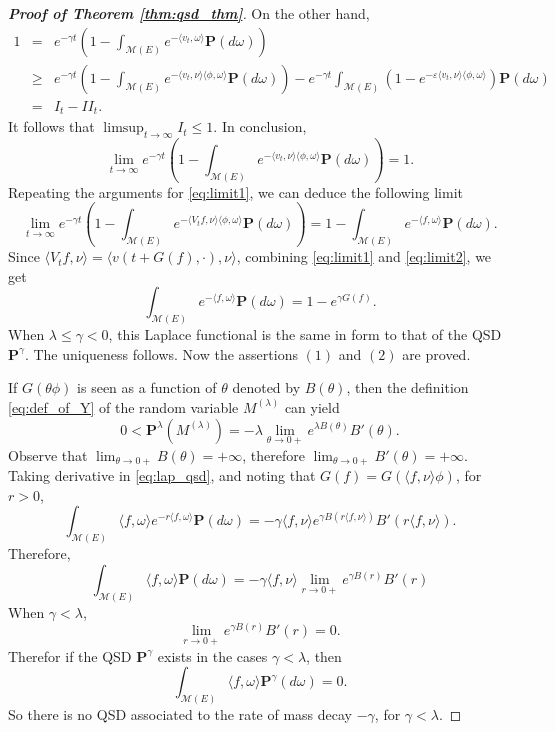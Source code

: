 \documentclass[12pt,a4paper]{amsart}
\numberwithin{equation}{section}
\theoremstyle{plain}
\theoremstyle{definition}
\begin{document}
{\begin{proof}[{\bf Proof of Theorem \ref{thm:qsd_thm}}]
  On the other hand,
  \begin{eqnarray*}
    1&=&e^{-\gamma t}\left(1-\int_{\mathcal M(E)}e^{-\langle v_t,\omega\rangle }\mathbf P(d\omega)\right)\\
     &\geq &e^{-\gamma t}\left(1-\int_{\mathcal M(E)}e^{-\langle v_t,\nu\rangle\langle\phi,\omega\rangle }\mathbf P(d\omega)\right)-e^{-\gamma t}\int_{\mathcal M(E)}\left(1-e^{-\varepsilon\langle v_t,\nu\rangle\langle\phi,\omega\rangle  }\right)\mathbf P(d\omega)\\
     &=&I_t-II_t.
  \end{eqnarray*}
  It follows that $\limsup_{t\to\infty}I_t\leq 1$. In conclusion,
  \begin{equation}\label{eq:limit1}
    \lim_{t\rightarrow\infty}e^{-\gamma t}\left(1-\int_{\mathcal M(E)}e^{-\langle v_t,\nu\rangle\langle\phi,\omega\rangle }\mathbf P(d\omega)\right)=1.
  \end{equation}
  Repeating the arguments for \eqref{eq:limit1}, we can deduce the following limit
  \begin{equation}\label{eq:limit2}
    \lim_{t\rightarrow\infty}e^{-\gamma t}\left(1-\int_{\mathcal M(E)}e^{-\langle V_tf,\nu\rangle \langle \phi,\omega\rangle }\mathbf P(d\omega)\right)=1-\int_{\mathcal M(E)}e^{-\langle f,\omega\rangle }\mathbf P(d\omega).
  \end{equation}
  Since $\langle V_tf,\nu\rangle =\langle v(t+G(f),\cdot),\nu\rangle $, combining \eqref{eq:limit1} and \eqref{eq:limit2}, we get
  \begin{equation}\label{eq:lap_qsd}
    \int_{\mathcal M(E)}e^{-\langle f,\omega\rangle }\mathbf P(d\omega)=1-e^{\gamma G(f)}.
  \end{equation}
  When  $\lambda\leq\gamma<0$, this Laplace functional is the same in form to that of the QSD $\mathbf P^{\gamma}$.  The uniqueness follows.  Now the assertions $(1)$ and $(2)$ are proved.

  If $G(\theta\phi)$ is seen as a function of $\theta$ denoted by $B(\theta)$, then the definition \eqref{eq:def_of_Y} of the
  random variable $M^{(\lambda)}$ can yield
  \[
    0<\mathbf P^{\lambda}(M^{(\lambda)})=-\lambda\lim_{\theta\rightarrow 0+} e^{\lambda B(\theta)}B'(\theta).
  \]
  Observe that $\lim_{\theta\rightarrow 0+} B(\theta)=+\infty$, therefore $\lim_{\theta\rightarrow 0+}B'(\theta)=+\infty$. Taking derivative in \eqref{eq:lap_qsd},
  and noting that $G(f)=G(\langle f,\nu\rangle\phi)$, for $r>0$,
  \[
    \int_{\mathcal M(E)}\langle f,\omega\rangle e^{-r\langle f,\omega\rangle }\mathbf P(d\omega)
    =-\gamma \langle f,\nu\rangle  e^{\gamma B(r\langle f,\nu\rangle)}B'(r\langle f,\nu\rangle).
  \]
  Therefore,
  \[
    \int_{\mathcal M(E)}\langle f,\omega\rangle \mathbf P(d\omega)=-\gamma \langle f,\nu\rangle  \lim_{r\rightarrow 0+}e^{\gamma B(r)}B'(r)
  \]
  When $\gamma<\lambda$,
  \[
    \lim_{r\rightarrow 0+}e^{\gamma B(r)}B'(r)=0.
  \]
  Therefor if the QSD $\mathbf P^{\gamma}$ exists in the cases $\gamma<\lambda$, then
  \[
    \int_{\mathcal M(E)}\langle f,\omega\rangle \mathbf P^{\gamma}(d\omega)=0.
  \]
  So there is no QSD associated to the rate of mass decay $-\gamma$, for $\gamma<\lambda$.
\end{proof}

}
\end{document}
